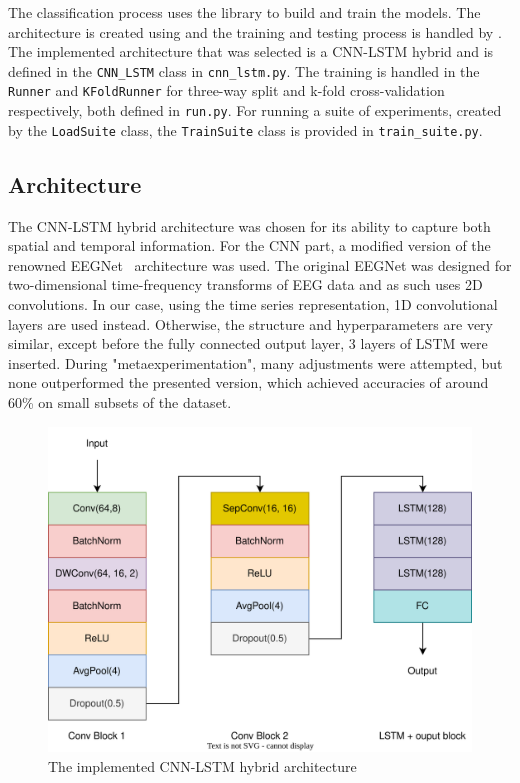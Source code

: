 \documentclass[english, he, bc, kiv, iso690alph]{fasthesis}
\begin{document}
The classification process uses the  library to build and train the models. The architecture is created using  and the training and testing process is handled by . The implemented architecture that was selected is a CNN-LSTM hybrid and is defined in the \texttt{CNN\_LSTM} class in \texttt{cnn\_lstm.py}. The training is handled in the \texttt{Runner} and \texttt{KFoldRunner} for three-way split and k-fold cross-validation respectively, both defined in \texttt{run.py}. For running a suite of experiments, created by the \texttt{LoadSuite} class, the \texttt{TrainSuite} class is provided in \texttt{train\_suite.py}.

\subsection{Architecture}

The CNN-LSTM hybrid architecture was chosen for its ability to capture both spatial and temporal information. For the CNN part, a modified version of the renowned EEGNet~\cite{lawhern:eegnet:18} architecture was used. The original EEGNet was designed for two-dimensional time-frequency transforms of EEG data and as such uses 2D convolutions. In our case, using the time series representation, 1D convolutional layers are used instead. Otherwise, the structure and hyperparameters are very similar, except before the fully connected output layer, 3 layers of LSTM were inserted. During "metaexperimentation", many adjustments were attempted, but none outperformed the presented version, which achieved accuracies of around 60\% on small subsets of the dataset.

\begin{figure}
	\centering
	\includegraphics[width=\textwidth]{fig/arch}
	\caption{The implemented CNN-LSTM hybrid architecture}
	\label{fig:arch}
\end{figure}
\end{document}
